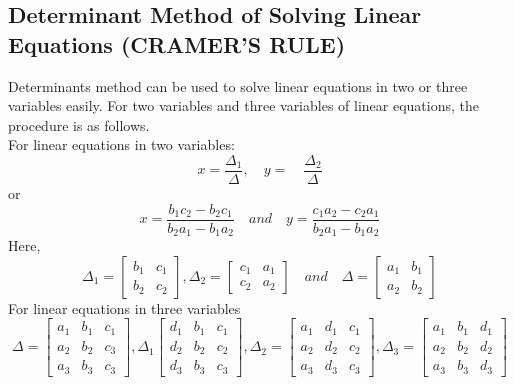 \documentclass[a4paper, 12pt]{report}
\begin{document}
{      \subsection{Determinant Method of Solving Linear Equations (CRAMER'S RULE)}
      Determinants method can be used to solve linear equations in two or three variables easily. For two variables and three variables of linear equations, the procedure is as follows.\\
      For linear equations in two variables: 
      \begin{equation*}
      x= \frac {\Delta_1} {\Delta}, \quad y= \quad \frac {\Delta_2} {\Delta} 
      \end{equation*}
      or
      \begin{equation*}
      x = \frac{ b_1 c_2 - b_2 c_1 }{ b_2 a_1 - b_1 a_2 } \quad and \quad  y = \frac{ c_1 a_2 - c_2 a_1 }{ b_2 a_1 - b_1 a_2 }
     \end{equation*}
     Here,
     \begin{equation*}
      \Delta_1 =
      \begin{bmatrix}
      b_1&c_1\\
      b_2&c_2
      \end{bmatrix}
      ,
      \Delta_2 =
      \begin{bmatrix}
      c_1&a_1\\
      c_2&a_2
      \end{bmatrix}
      \quad and \quad
      \Delta =
      \begin{bmatrix}
      a_1&b_1\\
      a_2&b_2
      \end{bmatrix}
      \end{equation*}
      For linear equations in three variables
      \begin{equation*}
      \Delta =
      \begin{bmatrix}
      a_1&b_1&c_1\\
      a_2&b_2&c_3\\
      a_3&b_3&c_3
      \end{bmatrix}
      ,
      \Delta_1 
      \begin{bmatrix}
      d_1&b_1&c_1\\
      d_2&b_2&c_2\\
      d_3&b_3&c_3
      \end{bmatrix}
      ,
      \Delta_2 =
      \begin{bmatrix}
      a_1&d_1&c_1\\
      a_2&d_2&c_2\\
      a_3&d_3&c_3
      \end{bmatrix}
      ,
      \Delta_3 =
      \begin{bmatrix}
      a_1&b_1&d_1\\
      a_2&b_2&d_2\\
      a_3&b_3&d_3
      \end{bmatrix}
      \end{equation*}\\
      
}
\end{document}
